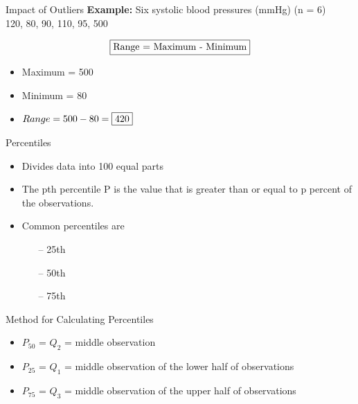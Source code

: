 \documentclass[10pt,dvipsnames, aspectratio=169]{beamer}
\begin{document}
\begin{frame}[t]{Impact of Outliers}
	\textbf{Example:}	Six systolic blood pressures (mmHg) (n = 6) \\
	120, 80, 90, 110, 95, 500
	
	$$
	\fbox{Range = Maximum - Minimum}
	$$ 
	
	\begin{itemize}
		\item Maximum = 500
		\item Minimum = 80 
		\item 	$
		Range = 500 - 80 = \fbox{420}
		$ 
	\end{itemize}
\end{frame}


\begin{frame}[t]{Percentiles}
	
	\begin{itemize}
		\item Divides data into 100 equal parts
		\item The pth percentile P is the value that is greater than or equal
		to p percent of the observations.
		\item Common percentiles are
		\begin{itemize}
			\item[--] 25th
			\item[--] 50th
			\item[--] 75th
		\end{itemize}
	\end{itemize}
\end{frame}


\begin{frame}[t]{Method for Calculating Percentiles}
	\begin{itemize}
		\item $P_{50}$ = $Q_2$ = middle observation
		\item $P_{25}$ = $Q_1$ = middle observation of the lower half of
		observations
		\item $P_{75}$ = $Q_3$ = middle observation of the upper half of
		observations
	\end{itemize}
\end{frame}
\end{document}
